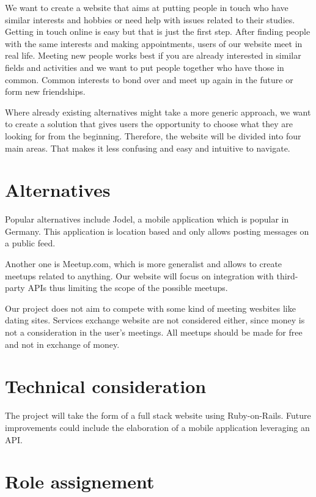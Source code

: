 \documentclass[conference]{IEEEtran}
\begin{document}
We want to create a website that aims at putting people in touch who have similar interests and hobbies or need help with issues related to their studies. Getting in touch online is easy but that is just the first step. After finding people with the same interests and making appointments, users of our website meet in real life. Meeting new people works best if you are already interested in similar fields and activities and we want to put people together who have those in common. Common interests to bond over and meet up again in the future or form new friendships.

Where already existing alternatives might take a more generic approach, we want to create a solution that gives users the opportunity to choose what they are looking for from the beginning. Therefore, the website will be divided into four main areas. That makes it less confusing and easy and intuitive to navigate.

\section{Alternatives}

Popular alternatives include Jodel, a mobile application which is popular in Germany. This application is location based and only allows posting messages on a public feed.

Another one is Meetup.com, which is more generalist and allows to create meetups related to anything. Our website will focus on integration with third-party APIs thus limiting the scope of the possible meetups.

Our project does not aim to compete with some kind of meeting wesbites like dating sites. Services exchange website are not considered either, since money is not a consideration in the user’s meetings. All meetups should be made for free and not in exchange of money.

\section{Technical consideration}

The project will take the form of a full stack website using Ruby-on-Rails. Future improvements could include the elaboration of a mobile application leveraging an API.

\section{Role assignement}
\end{document}
